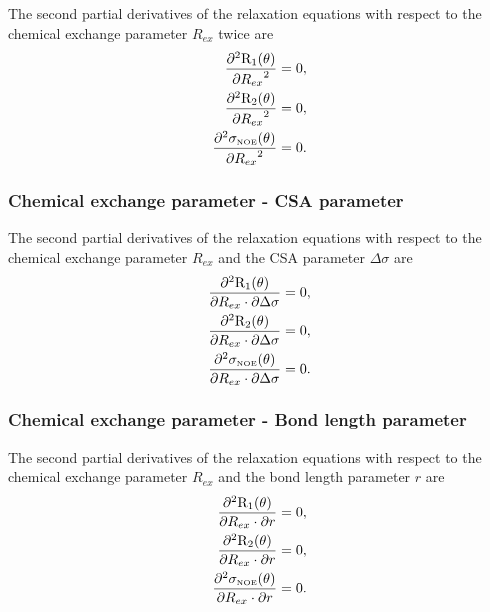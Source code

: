 The second partial derivatives of the relaxation equations with respect to the chemical exchange parameter $R_{ex}$ twice are
\begin{align}
    \frac{\partial^2 \mathrm{R}_1(\theta)}{{\partial R_{ex}}^2} &= 0,        \label{eq: Ri': d2R1/dRex2} \\
    \frac{\partial^2 \mathrm{R}_2(\theta)}{{\partial R_{ex}}^2} &= 0,        \label{eq: Ri': d2R2/dRex2} \\
    \frac{\partial^2 \sigma_{\scriptscriptstyle \mathrm{NOE}}(\theta)}{{\partial R_{ex}}^2} &= 0. \label{eq: Ri': d2sigmaNOE/dRex2}
\end{align}


\subsubsection{Chemical exchange parameter - CSA parameter}

The second partial derivatives of the relaxation equations with respect to the chemical exchange parameter $R_{ex}$ and the CSA parameter $\Delta\sigma$ are
\begin{align}
    \frac{\partial^2 \mathrm{R}_1(\theta)}{\partial R_{ex} \cdot \partial \Delta\sigma} &= 0,        \label{eq: Ri': d2R1/dRex.dCSA} \\
    \frac{\partial^2 \mathrm{R}_2(\theta)}{\partial R_{ex} \cdot \partial \Delta\sigma} &= 0,        \label{eq: Ri': d2R2/dRex.dCSA} \\
    \frac{\partial^2 \sigma_{\scriptscriptstyle \mathrm{NOE}}(\theta)}{\partial R_{ex} \cdot \partial \Delta\sigma} &= 0. \label{eq: Ri': d2sigmaNOE/dRex.dCSA}
\end{align}


\subsubsection{Chemical exchange parameter - Bond length parameter}

The second partial derivatives of the relaxation equations with respect to the chemical exchange parameter $R_{ex}$ and the bond length parameter $r$ are
\begin{align}
    \frac{\partial^2 \mathrm{R}_1(\theta)}{\partial R_{ex} \cdot \partial r} &= 0,           \label{eq: Ri': d2R1/dRex.dr} \\
    \frac{\partial^2 \mathrm{R}_2(\theta)}{\partial R_{ex} \cdot \partial r} &= 0,           \label{eq: Ri': d2R2/dRex.dr} \\
    \frac{\partial^2 \sigma_{\scriptscriptstyle \mathrm{NOE}}(\theta)}{\partial R_{ex} \cdot \partial r} &= 0.    \label{eq: Ri': d2sigmaNOE/dRex.dr}
\end{align}


